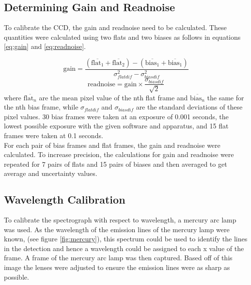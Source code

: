 \documentclass[a4paper,12pt,twocolumn]{article}
\let\cite=\supercite
\begin{document}
		\subsection{Determining Gain and Readnoise}
			To calibrate the CCD, the gain and readnoise need to be calculated. These quantities were calculated using two flats and two biases as follows in equations \ref{eq:gain} and \ref{eq:readnoise}\cite{manual}.
			
			\begin{equation}
				\text{gain} = \frac{(\overline{\text{flat}_1} + \overline{\text{flat}_2}) - (\overline{\text{bias}_1} + \overline{\text{bias}_1})}{\sigma_{flatdif}^2 - \sigma_{biasdif}^2}
				\label{eq:gain}
			\end{equation}
			\begin{equation}
				\text{readnoise} = \text{gain} \times \frac{\sigma_{biasdif}}{\sqrt{2}}
				\label{eq:readnoise}
			\end{equation} where $\overline{\text{flat}_n}$ are the mean pixel value of the nth flat frame and $\overline{\text{bias}_n}$ the same for the nth bias frame, while $\sigma_{flatdif}$ and $\sigma_{biasdif}$ are the standard deviations of these pixel values. 30 bias frames were taken at an exposure of 0.001 seconds, the lowest possible exposure with the given software and apparatus, and 15 flat frames were taken at 	0.1 seconds.\\
			
			For each pair of bias frames and flat frames, the gain and readnoise were calculated. To increase precision, the calculations for gain and readnoise were repeated for 7 pairs of flats and 15 pairs of biases and then averaged to get average and uncertainty values.
		
		\subsection{Wavelength Calibration}
			To calibrate the spectrograph with respect to wavelength, a mercury arc lamp was used. As the wavelength of the emission lines of the mercury lamp were known, (see figure \ref{fig:mercury}), this spectrum could be used to identify the lines in the detection and hence a wavelength could be assigned to each x value of the frame. A frame of the mercury arc lamp was then captured. Based off of this image the lenses were adjusted to ensure the emission lines were as sharp as possible.\\
			
\end{document}
